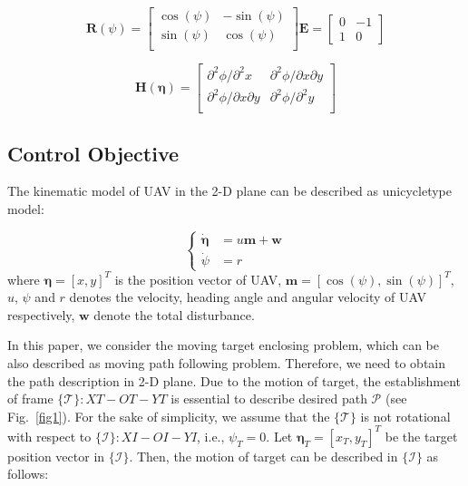 \documentclass[a4paper, 10pt, conference]{ieeeconf}      %
\begin{document}
\begin{equation}\label{eq1}
	\bm{R}(\psi)=
	\begin{bmatrix}
		\cos(\psi) & -\sin(\psi)\\
		\sin(\psi) & \cos(\psi)\\
	\end{bmatrix}
    \bm{E}=
	\begin{bmatrix}
		0 & -1\\
		1 & 0
	\end{bmatrix}
\end{equation}

\begin{equation}\label{eq2}
	\bm{H}(\bm{\eta})=
	\begin{bmatrix}
		\partial^{2} \phi/\partial^{2} x & \partial^{2} \phi/\partial x\partial y\\
		\partial^{2} \phi/\partial x\partial y & \partial^{2} \phi/\partial^{2} y\\
	\end{bmatrix}
\end{equation}

\subsection{Control Objective}

The kinematic model of UAV in the 2-D plane can be described as unicycletype
model:

\begin{equation}\label{eq3}
	\left\{
	\begin{aligned}
		\dot{\bm{\eta}}&=u\bm{m}+\bm{w}\\
		\dot{\psi}&=r
	\end{aligned}
	\right.
\end{equation}
where $\bm{\eta}=[x,y]^T$ is the position vector of UAV, $\bm{m}=[\cos(\psi),\sin(\psi)]^T$, $u$, $\psi$ and $r$ denotes the velocity, heading angle and angular velocity of UAV respectively, $\bm{w}$ denote the total disturbance.

In this paper, we consider the moving target enclosing problem, which can be also described as moving path following problem. Therefore, we need to obtain the path description in 2-D plane. Due to the motion of target, the establishment of frame $\{\mathcal{T}\}:XT-OT-YT$ is essential to describe desired path $\mathcal{P}$ (see Fig.~\ref{fig1}). For the sake of simplicity, we assume that the $\{\mathcal{T}\}$ is not rotational with respect to $\{\mathcal{I}\}: XI-OI-YI$, i.e., $\psi_T=0$. Let $\bm{\eta}_T=[x_T,y_T ]^T$ be the target position vector in $\{\mathcal{I}\}$. Then, the motion of target can be described in $\{\mathcal{I}\}$ as follows:
\end{document}
